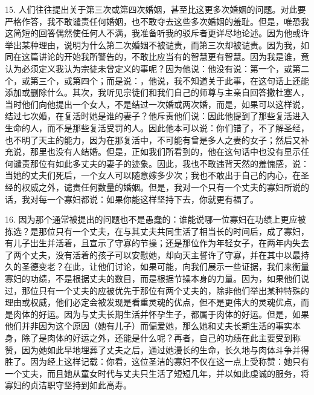 15. 人们往往提出关于第三次或第四次婚姻，甚至比这更多次婚姻的问题。对此要严格作答，我不敢谴责任何婚姻，也不敢夺去这些多次婚姻的羞耻。但是，唯恐我这简短的回答偶然使任何人不满，我准备听我的驳斥者更详尽地论述。因为他或许举出某种理由，说明为什么第二次婚姻不被谴责，而第三次却被谴责。因为我，如同在这篇讲论的开始我所警告的，不敢比应当有的智慧更有智慧。因为我是谁，竟认为必须定义我认为宗徒未曾定义的事呢？因为他说：他没有说：第一个，或第二个，或第三个，或第四个；而是说：，他说，我不知道关于此事，在这句话上还能添加或删除什么。其次，我听见宗徒们和我们自己的师尊与主亲自回答撒杜塞人，当时他们向他提出一个女人，不是结过一次婚或两次婚，而是，如果可以这样说，结过七次婚，在复活时她是谁的妻子？他斥责他们说：因此他提到了那些复活进入生命的人，而不是那些复活受罚的人。因此他本可以说：你们错了，不了解圣经，也不明了天主的能力，因为在那复活中，不可能有曾是多人之妻的女子；然后又补充说，那里也没有人结婚。但是，正如我们所看到的，他在这句话中也没有显示任何谴责那位有如此多丈夫的妻子的迹象。因此，我也不敢违背天然的羞愧感，说：当她的丈夫们死后，一个女人可以随意嫁多少次；我也不敢出于自己的内心，在圣经的权威之外，谴责任何数量的婚姻。但是，我对一个只有一个丈夫的寡妇所说的话，我对每一个寡妇都说：如果你能这样坚持下去，你就更有福了。\par

16. 因为那个通常被提出的问题也不是愚蠢的：谁能说哪一位寡妇在功绩上更应被拣选？是那位只有一个丈夫，在与其丈夫共同生活了相当长的时间后，成了寡妇，有儿子出生并活着，且宣示了守寡的节操；还是那位作为年轻女子，在两年内失去了两个丈夫，没有活着的孩子可以安慰她，却向天主誓许了守寡，并在其中以最持久的圣德变老？在此，让他们讨论，如果可能，向我们展示一些证据，我们来衡量寡妇的功绩，不是根据丈夫的数目，而是根据节操本身的力量。因为，如果他们说过，那位只有一个丈夫的应被优先于那位有两个丈夫的，除非他们举出某种特殊的理由或权威，他们必定会被发现是看重灵魂的优点，但不是更伟大的灵魂优点，而是肉体的好运。因为与丈夫长期生活并怀孕生子，都属于肉体的好运。但是，如果他们并非因为这个原因（她有儿子）而偏爱她，那么她和丈夫长期生活的事实本身，除了是肉体的好运之外，还能是什么呢？再者，自己的功绩在此主要受到称赞，因为她如此早地埋葬了丈夫之后，通过她漫长的生命，长久地与肉体斗争并得胜了。因为经上这样记载：你看，这位圣洁的寡妇不仅在这一点上受称赞：她只有一个丈夫，而且她从童女时代与丈夫只生活了短短几年，并以如此虔诚的服务，将寡妇的贞洁职守坚持到如此高寿。\par

